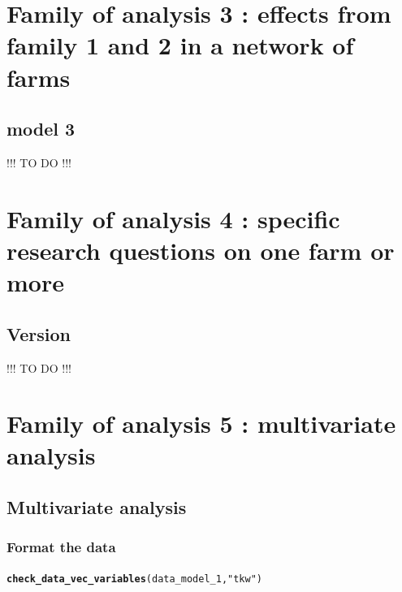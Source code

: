 \documentclass{book}\usepackage[]{graphicx}\usepackage[]{color}
\makeatletter
\newcommand{\hlstr}[1]{\textcolor[rgb]{0.192,0.494,0.8}{#1}}%
\newcommand{\hlstd}[1]{\textcolor[rgb]{0.345,0.345,0.345}{#1}}%
\newcommand{\hlkwd}[1]{\textcolor[rgb]{0.737,0.353,0.396}{\textbf{#1}}}%
\newenvironment{kframe}{%
 \def\at@end@of@kframe{}%
 \ifinner\ifhmode%
  \def\at@end@of@kframe{\end{minipage}}%
  \begin{minipage}{\columnwidth}%
 \fi\fi%
 \def\FrameCommand##1{\hskip\@totalleftmargin \hskip-\fboxsep
 \colorbox{shadecolor}{##1}\hskip-\fboxsep
     \hskip-\linewidth \hskip-\@totalleftmargin \hskip\columnwidth}%
 \MakeFramed {\advance\hsize-\width
   \@totalleftmargin\z@ \linewidth\hsize
   \@setminipage}}%
 {\par\unskip\endMakeFramed%
 \at@end@of@kframe}
\newenvironment{knitrout}{}{} %
\makeatother
\begin{document}
\newpage


\section{Family of analysis 3 : effects from family 1 and 2 in a network of farms}
\label{section_analysis3}


\subsection{model 3 }
\label{model_3}

!!! TO DO !!!

\newpage

\section{Family of analysis 4 : specific research questions on one farm or more}
\label{section_analysis4}


\subsection{Version}
\label{version}


!!! TO DO !!!
\newpage

\section{Family of analysis 5 : multivariate analysis}
\label{section_analysis5}


\subsection{Multivariate analysis}
\label{multivariate_analysis}

\subsubsection{Format the data}

\begin{knitrout}
\color{fgcolor}\begin{kframe}
\begin{alltt}
\hlkwd{check_data_vec_variables}\hlstd{(data_model_1,} \hlstr{"tkw"}\hlstd{)}
\end{alltt}
\end{kframe}
\end{knitrout}
\end{document}
